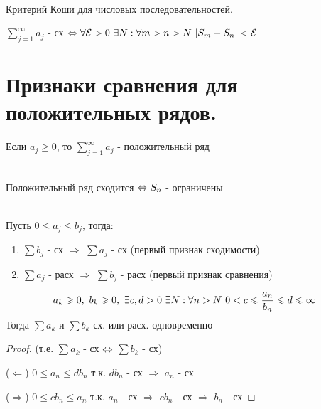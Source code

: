 \documentclass[12pt, fleqn]{article}
\begin{document}
\begin{Property}[3]
\begin{Property}[4]
\begin{Property}[2, аддитивность]
\begin{Reminder} 
\begin{theorem}\ \\
    Критерий Коши для числовых последовательностей. 
    
    $\sum\limits_{j=1}^\infty a_j$ - сх $\Leftrightarrow \forall \mathcal{E} > 0\ \exists N: \forall m>n>N\ |S_m-S_n|<\mathcal{E}$
\end{theorem}
\end{Reminder}

\newpage
\section{Признаки сравнения для положительных рядов.}
 
\begin{definition}
    Если $a_j \geqslant 0$, то $\sum\limits_{j=1}^\infty a_j$ - положительный ряд
\end{definition}

\begin{theorem}\ \\
    Положительный ряд сходится $\Leftrightarrow S_n$ - ограничены
\end{theorem}

\begin{consequence} \ \\
    Пусть $0 \leqslant a_j \leqslant b_j$, тогда:
    \begin{enumerate}
        \item $\sum b_j$ - сх $\Rightarrow$ $\sum a_j$ - сх (первый признак сходимости)
        \item $\sum a_j$ - расх $\Rightarrow$ $\sum b_j$ - расх (первый признак сравнения)
    \end{enumerate}
\end{consequence} 

\begin{Consequence}
    \[a_k \geqslant 0,\ b_k \geqslant 0,\ \exists c,d > 0\ \exists N: \forall n > N\ 0 < c \leqslant \frac{a_n}{b_n} \leqslant d \leqslant \infty\]
    Тогда $\sum a_k$ и $\sum b_k$ сх. или расх. одновременно
\end{Consequence}

\begin{proof}
    (т.е. $\sum a_k$ - сх $\Leftrightarrow$ $\sum b_k$ - сх)
    
    ($\Leftarrow$) $0 \leqslant a_n \leqslant d b_n$ т.к. $d b_n$ - сх $\Rightarrow$ $a_n$ - сх
    
    ($\Rightarrow$) $0 \leqslant c b_n \leqslant a_n$ т.к. $a_n$ - сх $\Rightarrow$ $c b_n$ - сх $\Rightarrow$ $b_n$ - сх
\end{proof}


\end{Property}
\end{Property}
\end{Property}
\end{document}

